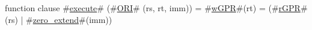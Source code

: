function clause #\hyperref[zexecute]{execute}# (#\hyperref[zORI]{ORI}# (rs, rt, imm)) =
  {
    #\hyperref[zwGPR]{wGPR}#(rt) = (#\hyperref[zrGPR]{rGPR}#(rs) | #\hyperref[zzzerozyextend]{zero\_extend}#(imm))
  }
